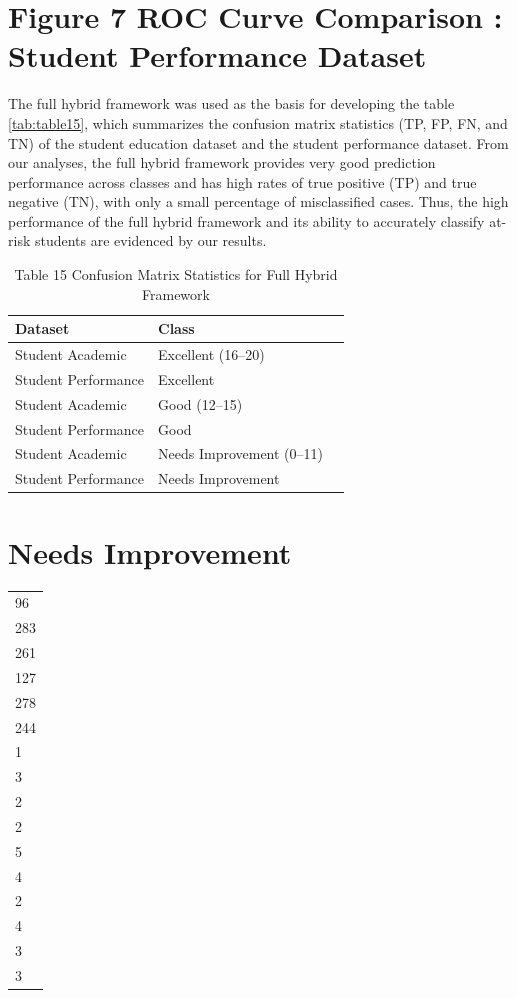 \documentclass[twocolumn]{svjour3}
\begin{document}
\section{Figure 7 ROC Curve Comparison : Student Performance Dataset}
The full hybrid framework was used as the basis for developing the table \ref{tab:table15}, which summarizes the confusion matrix statistics (TP, FP, FN, and TN) of the student education dataset and the student performance dataset. From our analyses, the full hybrid framework provides very good prediction performance across classes and has high rates of true positive (TP) and true negative (TN), with only a small percentage of misclassified cases. Thus, the high performance of the full hybrid framework and its ability to accurately classify at-risk students are evidenced by our results.
\begin{table}
\centering
\caption{Table 15 Confusion Matrix Statistics for Full Hybrid Framework}
\begin{tabular}{lll}
\hline
Dataset & Class & \\
\hline
Student Academic & Excellent (16–20) & \\
Student Performance & Excellent & \\
Student Academic & Good (12–15) & \\
Student Performance & Good & \\
Student Academic & Needs Improvement (0–11) & \\
Student Performance & Needs Improvement & \\
\hline
\end{tabular}
\end{table}

\section{Needs Improvement}
\begin{tabular}{l}
\hline
96 \\
283 \\
261 \\
127 \\
278 \\
244 \\
1 \\
3 \\
2 \\
2 \\
5 \\
4 \\
2 \\
4 \\
3 \\
3 \\
\hline
\end{tabular}
\end{document}
